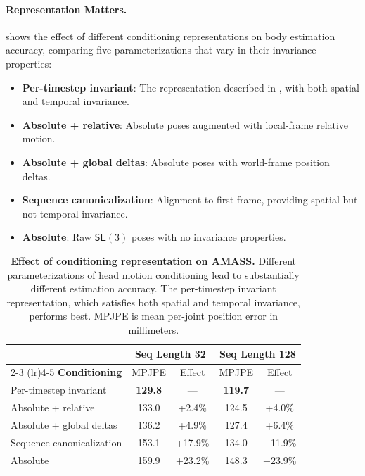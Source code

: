 \documentclass[../../book-main.tex]{subfiles}
\begin{document}
\paragraph{Representation Matters.}
 shows the effect of different
conditioning representations on body estimation accuracy, comparing
five parameterizations that vary in their invariance properties:
\begin{itemize}
    \item \textbf{Per-timestep invariant}: The representation
        described in , with
        both spatial and temporal invariance.
    \item \textbf{Absolute + relative}: Absolute poses augmented with
        local-frame relative motion.
    \item \textbf{Absolute + global deltas}: Absolute poses with
        world-frame position deltas.
    \item \textbf{Sequence canonicalization}: Alignment to first
        frame, providing spatial but not temporal invariance.
    \item \textbf{Absolute}: Raw \(\mathsf{SE}(3)\) poses with no invariance properties.
\end{itemize}

\begin{table}[t]
    \centering
    \caption{\small\textbf{Effect of conditioning representation on AMASS.}
        Different parameterizations of head motion conditioning lead to
        substantially different estimation accuracy. The per-timestep
        invariant representation, which satisfies both spatial and
        temporal invariance, performs best. MPJPE is mean per-joint
    position error in millimeters.}
    \label{tab:egoallo_cond_ablation}
    \small
    \begin{tabular}{lcccc}
        \toprule
        & \multicolumn{2}{c}{\textbf{Seq Length 32}} &
        \multicolumn{2}{c}{\textbf{Seq Length 128}} \\
        \cmidrule(lr){2-3} \cmidrule(lr){4-5}
        \textbf{Conditioning} & MPJPE & Effect & MPJPE & Effect \\
        \midrule
        Per-timestep invariant & \textbf{129.8} & 
        --- & \textbf{119.7} & --- \\
        Absolute + relative & 133.0 & +2.4\% & 124.5 & +4.0\% \\
        Absolute + global deltas & 136.2 & +4.9\% & 127.4 & +6.4\% \\
        Sequence canonicalization & 153.1 & +17.9\% & 134.0 & +11.9\% \\
        Absolute & 159.9 & +23.2\% & 148.3 & +23.9\% \\
        \bottomrule
    \end{tabular}
\end{table}
\end{document}
